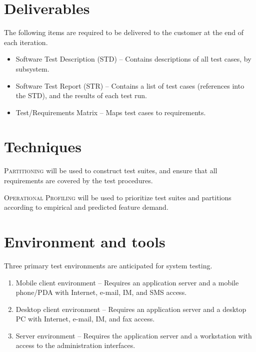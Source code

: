 \documentclass[11pt]{wacomepd}
\begin{document}
\section {Deliverables}
The following items are required to be delivered to the customer at the end of each iteration.

\begin{itemize}
\item Software Test Description (STD) -- Contains descriptions of all test cases, by subsystem.
\item Software Test Report (STR) -- Contains a list of test cases (references into the STD), and the
  results of each test run.
\item Test/Requirements Matrix -- Maps test cases to requirements.
\end{itemize}

\section {Techniques}

\textsc{Partitioning} will be used to construct test suites, and ensure that all requirements are
covered by the test procedures.

\textsc{Operational Profiling} will be used to prioritize test suites and partitions according to
empirical and predicted feature demand.

\section {Environment and tools}
Three primary test environments are anticipated for system testing.

\begin{enumerate}
\item Mobile client environment -- Requires an application server and a mobile phone/PDA with
  Internet, e-mail, IM, and SMS access.
\item Desktop client environment -- Requires an application server and a desktop PC with Internet,
  e-mail, IM, and fax access.
\item Server environment -- Requires the application server and a workstation with access to the
  administration interfaces.
\end{enumerate}
\end{document}
